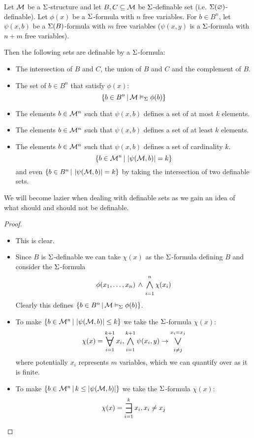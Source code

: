 \begin{lem}
    Let $\mathcal{M}$ be a $\Sigma$-structure and let $B,C \subseteq \mathcal{M}$ be $\Sigma$-definable
    set (i.e. $\Sigma(\varnothing)$-definable).
    Let $\phi(x)$ be a $\Sigma$-formula with $n$ free variables.
    For $b \in B^n$, let $\psi(x,b)$ be a $\Sigma(B)$-formula 
    with $m$ free variables ($\psi(x,y)$
    is a $\Sigma$-formula with $n+m$ free variables).

    Then the following sets are definable by a $\Sigma$-formula:
    \begin{itemize}
        \item The intersection of $B$ and $C$, the union of $B$ and $C$ and
            the complement of $B$.
        \item The set of $b \in B^n$ that satisfy $\phi(x)$:
            \[\left\{b \in B^n \,|\, \mathcal{M} \vDash_{\Sigma} \phi(b)\right\}\]
        \item The elements $b \in \mathcal{M}^n$ such that $\psi(x,b)$ defines a set of 
            at most $k$ elements.
        \item The elements $b \in \mathcal{M}^n$ such that $\psi(x,b)$ defines a set of 
            at least $k$ elements.
        \item The elements $b \in \mathcal{M}^n$ such that $\psi(x,b)$ defines a set of 
            cardinality $k$.
            \[\left\{b \in \mathcal{M}^n \,|\, \left\vert \psi(\mathcal{M},b) \right\vert = k\right\}\]
            and even $\left\{b \in B^n \,|\, \left\vert \psi(\mathcal{M},b) \right\vert = k\right\}$ by 
            taking the intersection of two definable sets.
    \end{itemize}
    We will become lazier when dealing with definable sets as we gain an idea 
    of what should and should not be definable.
\end{lem}
\begin{proof}
    \begin{itemize}
        \item This is clear.
        \item 
        Since $B$ is $\Sigma$-definable we can take $\chi(x)$ as the 
        $\Sigma$-formula defining $B$
        and consider the $\Sigma$-formula 
        \[\phi(x_1,\dots,x_n) \AND \bigand{i = 1}{n} \chi(x_i)\]
        Clearly this defines $\left\{b \in B^n \,|\, \mathcal{M} \vDash_{\Sigma} \phi(b)\right\}$.
        \item 
        To make $\left\{b \in \mathcal{M}^n \,|\, \left\vert \psi(\mathcal{M},b) \right\vert \leq k\right\}$
        we take the $\Sigma$-formula $\chi(x)$:
        \[
            \chi(x) = \bigforall{i = 1}{k + 1} x_i,
            \bigand{i = 1}{k + 1} \psi(x_i,y) \to \bigor{i \ne j}{x_i = x_j}
        \]
        where potentially $x_i$ represents $m$ variables, which we can 
        quantify over as it is finite.
        \item 
        To make $\left\{b \in \mathcal{M}^n \,|\, k \leq \left\vert \psi(\mathcal{M},b) \right\vert\right\}$
        we take the $\Sigma$-formula $\chi(x)$:
        \[
            \chi(x) = \bigexists{i = 1}{k} x_i, {x_i \ne x_j}
        \]
    \end{itemize}
\end{proof}

